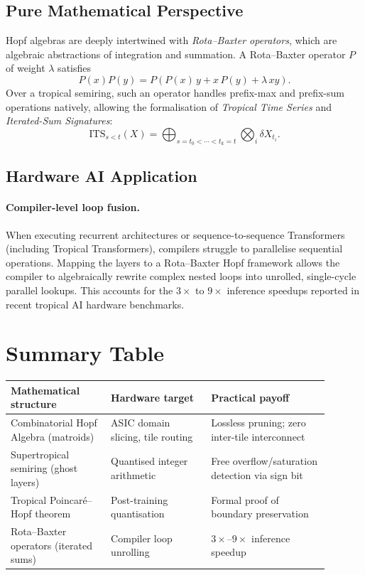 \documentclass[11pt]{article}
\begin{document}
\subsection{Pure Mathematical Perspective}

Hopf algebras are deeply intertwined with \emph{Rota--Baxter operators}, which are algebraic abstractions of integration and summation. A Rota--Baxter operator $P$ of weight $\lambda$ satisfies
\begin{equation}
P(x) P(y) = P\!\left(P(x)\,y + x\,P(y) + \lambda\,xy\right).
\end{equation}
Over a tropical semiring, such an operator handles prefix-max and prefix-sum operations natively, allowing the formalisation of \emph{Tropical Time Series} and \emph{Iterated-Sum Signatures}:
\begin{equation}
\mathrm{ITS}_{s < t}(X) = \bigoplus_{s = t_0 < \cdots < t_k = t} \bigotimes_{i} \delta X_{t_i}.
\end{equation}

\subsection{Hardware AI Application}

\paragraph{Compiler-level loop fusion.}
When executing recurrent architectures or sequence-to-sequence Transformers (including Tropical Transformers), compilers struggle to parallelise sequential operations. Mapping the layers to a Rota--Baxter Hopf framework allows the compiler to algebraically rewrite complex nested loops into unrolled, single-cycle parallel lookups. This accounts for the $3\times$ to $9\times$ inference speedups reported in recent tropical AI hardware benchmarks.

\section{Summary Table}

\begin{center}
\begin{tabular}{p{0.28\linewidth}p{0.28\linewidth}p{0.33\linewidth}}
\toprule
\textbf{Mathematical structure} & \textbf{Hardware target} & \textbf{Practical payoff} \\
\midrule
Combinatorial Hopf Algebra (matroids) & ASIC domain slicing, tile routing & Lossless pruning; zero inter-tile interconnect \\
Supertropical semiring (ghost layers) & Quantised integer arithmetic & Free overflow/saturation detection via sign bit \\
Tropical Poincar\'{e}--Hopf theorem & Post-training quantisation & Formal proof of boundary preservation \\
Rota--Baxter operators (iterated sums) & Compiler loop unrolling & $3\times$--$9\times$ inference speedup \\
\bottomrule
\end{tabular}
\end{center}
\end{document}
